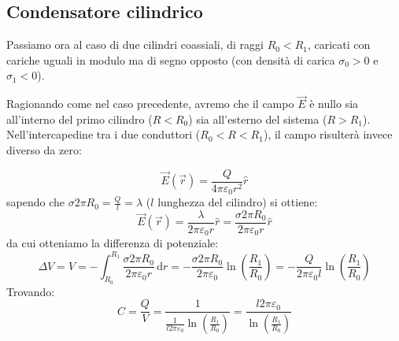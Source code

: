 \documentclass{book}
\begin{document}
\subsection{Condensatore cilindrico}

Passiamo ora al caso di due cilindri coassiali, di raggi $R_0 < R_1$, caricati con cariche uguali in modulo ma di segno opposto (con densità di carica $\sigma_0 > 0$ e $\sigma_1 < 0$).

Ragionando come nel caso precedente, avremo che il campo $\vec{E}$ è nullo sia all'interno del primo cilindro ($R < R_0$) sia all'esterno del sistema ($R > R_1$). Nell'intercapedine tra i due conduttori ($R_0 < R < R_1$), il campo risulterà invece diverso da zero:

\[
\vec{E}(\vec{r})=\frac{Q}{4\pi\varepsilon_0 r^2}\hat{r}
\]
sapendo che $\sigma 2\pi R_0 =\frac{Q}{l}=\lambda$ ($l$ lunghezza del cilindro)  si ottiene:
\[
\vec{E}(\vec{r})= \frac{\lambda}{2\pi\varepsilon_0 r}\hat{r}=\frac{\sigma 2 \pi R_0}{2 \pi \varepsilon_0 r}\hat{r}
\]
da cui otteniamo la differenza di potenziale:
\[
\Delta V = V = - \int_{R_0}^{R_1} \frac{\sigma 2 \pi R_0}{2\pi\varepsilon_0 r}\,\mathrm{d}r = - \frac{\sigma 2 \pi R_0}{2\pi\varepsilon_0}\ln\left(\frac{R_1}{R_0}\right)= - \frac{Q}{2 \pi \varepsilon_0 l } \ln\left(\frac{R_1}{R_0}\right)
\]
Trovando:
\[
C = \frac{Q}{V}= \frac{1}{\frac{1}{l2\pi\varepsilon_0}\ln\left(\frac{R_1}{R_0}\right)}= \frac{l2\pi\varepsilon_0}{\ln\left(\frac{R_1}{R_0}\right)}
\]
\begin{center}
\end{center}
\end{document}

